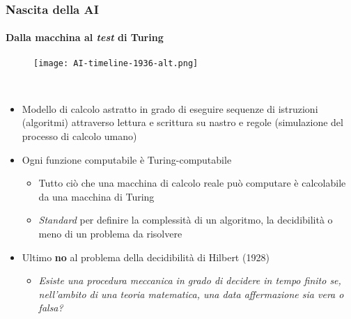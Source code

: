 %
\begin{frame}[t,fragile] \frametitle{Nascita della AI}
	{\scriptsize
		\onslide<1->
            \framesubtitle{Dalla macchina al \textit{test} di Turing}
            \vspace*{-15pt}
            \begin{minipage}[t]{\textwidth}
             	\begin{figure}[ht]
                    \centering
                    \texttt{[image: AI-timeline-1936-alt.png]}
                \end{figure}
            \end{minipage}
            \\\vspace*{3pt}
	    	\begin{minipage}[t]{\textwidth}
				\begin{minipage}[t]{0.6\textwidth}
	    			\begin{itemize}[leftmargin=10pt,align=right]
						\onslide<2->\item[\alert{\faArrowCircleRight}] Modello di calcolo astratto in grado di eseguire sequenze di istruzioni (\alert{algoritmi}) attraverso lettura e scrittura su nastro e regole (simulazione del processo di calcolo umano)
						\onslide<3->\item[\alert{\faArrowCircleRight}] Ogni funzione computabile è Turing-computabile
                    	\onslide<4->\begin{itemize}[leftmargin=10pt,align=right]
							\item[\alert{\faArrowCircleRight}] Tutto ciò che una macchina di calcolo reale può computare è calcolabile da una macchina di Turing
							\item[\alert{\faArrowCircleRight}] \textit{Standard} per definire la complessità di un algoritmo, la decidibilità o meno di un problema da risolvere
						\end{itemize}
                    	\item[\alert{\faArrowCircleRight}] Ultimo \alert{\textbf{no}} al \alert{problema della decidibilità} di Hilbert (1928)
						\begin{itemize}[leftmargin=10pt,align=right]
							\item[\alert{\faArrowCircleRight}] \textit{Esiste una procedura meccanica in grado di decidere in tempo finito se, nell'ambito di una teoria matematica, una data affermazione sia vera o falsa?}
						\end{itemize}
					\end{itemize}

\end{minipage}
\end{minipage}}
\end{frame}
